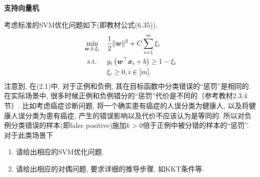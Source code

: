 \documentclass[answers]{exam}  %
\begin{document}
\begin{questions}
\question [20] \textbf{支持向量机}

考虑标准的SVM优化问题如下(即教材公式(6.35)), 
\begin{equation}
    \begin{aligned}
\min _{\boldsymbol{w}, b, \xi_{i}} \quad & \frac{1}{2}\|\boldsymbol{w}\|^{2}+C \sum_{i=1}^{m} \xi_{i} \\
\text { s.t. } \quad & y_{i}\left(\boldsymbol{w}^\top {\boldsymbol{x}}_{i}+b\right) \geq 1-\xi_{i} \\
& \xi_{i} \geq 0, i\in [m] .
\end{aligned}
\end{equation}
注意到, 在(2.1)中, 对于正例和负例, 其在目标函数中分类错误的“惩罚”是相同的. 在实际场景中, 很多时候正例和负例错分的“惩罚”代价是不同的（参考教材2.3.4节）. 比如考虑癌症诊断问题, 将一个确实患有癌症的人误分类为健康人, 以及将健康人误分类为患有癌症, 产生的错误影响以及代价不应该认为是等同的. 所以对负例分类错误的样本(即false positive)施加$k>0$倍于正例中被分错的样本的“惩罚”. 对于此类场景下
\begin{enumerate}
    \item 请给出相应的SVM优化问题.
    \item 请给出相应的对偶问题, 要求详细的推导步骤, 如KKT条件等.
\end{enumerate}


\end{questions}
\end{document}
